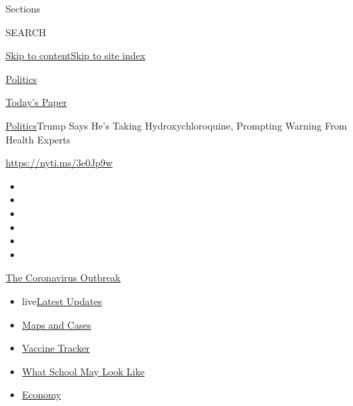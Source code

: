 Sections

SEARCH

\protect\hyperlink{site-content}{Skip to
content}\protect\hyperlink{site-index}{Skip to site index}

\href{https://www.nytimes3xbfgragh.onion/section/politics}{Politics}

\href{https://myaccount.nytimes3xbfgragh.onion/auth/login?response_type=cookie\&client_id=vi}{}

\href{https://www.nytimes3xbfgragh.onion/section/todayspaper}{Today's
Paper}

\href{/section/politics}{Politics}\textbar{}Trump Says He's Taking
Hydroxychloroquine, Prompting Warning From Health Experts

\url{https://nyti.ms/3e0Jp9w}

\begin{itemize}
\item
\item
\item
\item
\item
\item
\end{itemize}

\href{https://www.nytimes3xbfgragh.onion/news-event/coronavirus?action=click\&pgtype=Article\&state=default\&region=TOP_BANNER\&context=storylines_menu}{The
Coronavirus Outbreak}

\begin{itemize}
\tightlist
\item
  live\href{https://www.nytimes3xbfgragh.onion/2020/08/01/world/coronavirus-covid-19.html?action=click\&pgtype=Article\&state=default\&region=TOP_BANNER\&context=storylines_menu}{Latest
  Updates}
\item
  \href{https://www.nytimes3xbfgragh.onion/interactive/2020/us/coronavirus-us-cases.html?action=click\&pgtype=Article\&state=default\&region=TOP_BANNER\&context=storylines_menu}{Maps
  and Cases}
\item
  \href{https://www.nytimes3xbfgragh.onion/interactive/2020/science/coronavirus-vaccine-tracker.html?action=click\&pgtype=Article\&state=default\&region=TOP_BANNER\&context=storylines_menu}{Vaccine
  Tracker}
\item
  \href{https://www.nytimes3xbfgragh.onion/interactive/2020/07/29/us/schools-reopening-coronavirus.html?action=click\&pgtype=Article\&state=default\&region=TOP_BANNER\&context=storylines_menu}{What
  School May Look Like}
\item
  \href{https://www.nytimes3xbfgragh.onion/live/2020/07/31/business/stock-market-today-coronavirus?action=click\&pgtype=Article\&state=default\&region=TOP_BANNER\&context=storylines_menu}{Economy}
\end{itemize}

